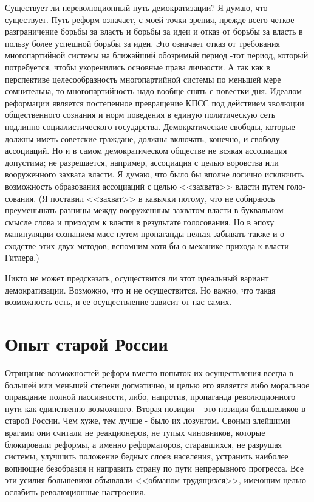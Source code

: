\documentclass{book}
\begin{document}
Существует ли нереволюционный путь демократизации? Я думаю, что существует. Путь реформ означает, с моей точки зрения, прежде всего четкое разграничение борьбы за власть и борьбы за идеи и отказ от борьбы за власть в пользу более успешной борьбы за идеи. Это означает отказ от требования многопартийной системы на ближайший обозримый период -тот период, который потребуется, чтобы укоренились основные права личности. А так как в перспективе целесообразность многопартийной системы по меньшей мере сомнительна, то мно­гопартийность надо вообще снять с повестки дня. Идеалом ре­формации является постепенное превращение КПСС под дей­ствием эволюции общественного сознания и норм поведения в единую политическую сеть подлинно социалистического госу­дарства. Демократические свободы, которые должны иметь советские граждане, должны включать, конечно, и свободу ассоциаций. Но и в самом демократическом обществе не вся­кая ассоциация допустима; не разрешается, например, ассо­циация с целью воровства или вооруженного захвата 
власти. Я думаю, что было бы вполне логично исключить возможность образования ассоциаций с целью <<захвата>> власти путем голо­сования. (Я поставил <<захват>> в кавычки потому, что не соби­раюсь преуменьшать разницы между вооруженным захватом власти в буквальном смысле слова и приходом к власти в ре­зультате голосования. Но в эпоху манипуляции сознанием масс путем пропаганды нельзя забывать также и о сходстве этих двух методов; вспомним хотя бы о механике прихода к власти Гитлера.)

Никто не может предсказать, осуществится ли этот идеальный вариант демократизации. Возможно, что и не осуществится. Но важно, что такая возможность есть, и ее осуществление зависит от нас самих.

\section{Опыт старой России}


Отрицание возможностей реформ вместо попыток их осу­ществления всегда в большей или меньшей степени догматич­но, и целью его является либо моральное оправдание полной пассивности, либо, напротив, пропаганда революционного пути как единственно возможного. Вторая позиция -- это позиция большевиков в старой России. Чем хуже, тем лучше - было их лозунгом. Своими злейшими врагами они считали не реакционеров, не тупых чиновников, которые блокировали реформы, а именно реформаторов, старавшихся, не разрушая системы, улучшить положение бедных слоев населения, устранить наиболее вопиющие безобразия и направить страну по пути непрерывного прогресса. Все эти усилия большевики объявляли <<обманом трудящихся>>, имеющим целью ослабить революционные настроения.
\end{document}
